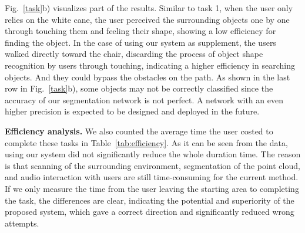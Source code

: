 \documentclass[10pt,twocolumn,letterpaper]{article}
\begin{document}
\iffalse
\begin{figure}[t]
\begin{center}
   \texttt{[image: figure/task1.pdf]}
\end{center}
   \vskip-4ex
   \caption{Visualization of task 1. \textbf{Left:} Use white cane only, floor maps and trajectories are manually plotted according to recorded videos; \textbf{Middle}: Use both white cane and system, floor maps plotted according to the saved point clouds, trajectories according to videos; \textbf{Right:} Instance segmentation and the system output visualization.}
\label{task1}
\vskip-2ex
\end{figure}

\begin{figure}[t]
\begin{center}
   \texttt{[image: figure/task2.pdf]}
\end{center}
   \vskip-4ex
   \caption{Visualization of task 2. \textbf{Left:} Use white cane only, floor maps and trajectories are manually plotted according to recorded videos; \textbf{Middle}: Use both white cane and system, floor maps plotted according to the saved point clouds, trajectories according to videos; \textbf{Right:} Instance segmentation and the system output visualization.}
\label{task2}
\vskip-2ex
\end{figure}
\fi

Fig.~\ref{task}b) visualizes part of the results. Similar to task 1, when the user only relies on the white cane, the user perceived the surrounding objects one by one through touching them and feeling their shape, showing a low efficiency for finding the object. In the case of using our system as supplement, the users walked directly toward the chair, discarding the process of object shape recognition by users through touching, indicating a higher efficiency in searching objects. And they could bypass the obstacles on the path. As shown in the last row in Fig.~\ref{task}b), some objects may not be correctly classified since the accuracy of our segmentation network is not perfect. A network with an even higher precision is expected to be designed and deployed in the future.

\noindent\textbf{Efficiency analysis.}
We also counted the average time the user costed to complete these tasks in Table~\ref{tab:efficiency}. As it can be seen from the data, using our system did not significantly reduce the whole duration time. The reason is that scanning of the surrounding environment, segmentation of the point cloud, and audio interaction with users are still time-consuming for the current method. If we only measure the time from the user leaving the starting area to completing the task, the differences are clear, indicating the potential and superiority of the proposed system, which gave a correct direction and significantly reduced wrong attempts.
\end{document}
